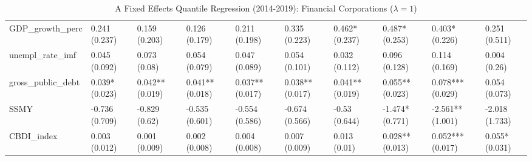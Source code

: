 \begin{table}[H]
{\begin{tabular}{llllllllll}
  GDP\_growth\_perc & 0.241 (0.237) & 0.159 (0.203) & 0.126 (0.179) & 0.211 (0.198) & 0.335 (0.223) & 0.462* (0.237) & 0.487* (0.253) & 0.403* (0.226) & 0.251 (0.511) \\ 
  unempl\_rate\_imf & 0.045 (0.092) & 0.073 (0.08) & 0.054 (0.079) & 0.047 (0.089) & 0.054 (0.101) & 0.032 (0.112) & 0.096 (0.128) & 0.114 (0.169) & 0.004 (0.26) \\ 
  gross\_public\_debt & 0.039* (0.023) & 0.042** (0.019) & 0.041** (0.018) & 0.037** (0.017) & 0.038** (0.017) & 0.041** (0.019) & 0.055** (0.023) & 0.078*** (0.029) & 0.054 (0.073) \\ 
  SSMY & -0.736 (0.709) & -0.829 (0.62) & -0.535 (0.601) & -0.554 (0.586) & -0.674 (0.566) & -0.53 (0.644) & -1.474* (0.771) & -2.561** (1.001) & -2.018 (1.733) \\ 
  CBDI\_index & 0.003 (0.012) & 0.001 (0.009) & 0.002 (0.008) & 0.004 (0.008) & 0.007 (0.009) & 0.013 (0.01) & 0.028** (0.013) & 0.052*** (0.017) & 0.055* (0.031) \\ 
   \bottomrule
\end{tabular}}
\caption{A Fixed Effects Quantile Regression (2014-2019): Financial Corporations ($\lambda = 1$)} 
\label{qrfe1_npl_fi}
\end{table}

